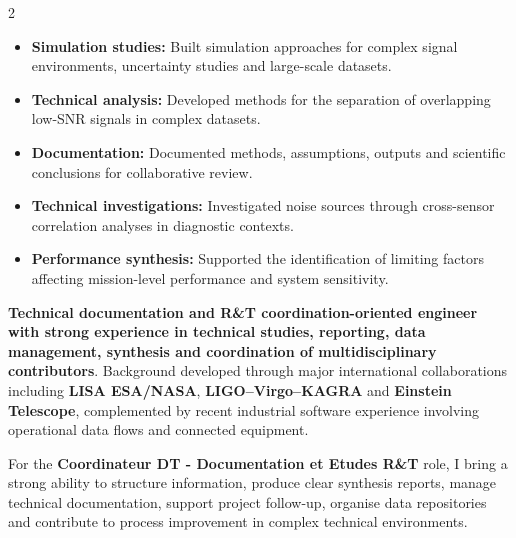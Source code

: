 \documentclass[8pt,a4paper,ragged2e,withhyper]{altacv}
\begin{document}
\begin{paracol}{2}
\begin{itemize}
  \item \textbf{Simulation studies:} Built simulation approaches for complex signal environments, uncertainty studies and large-scale datasets.
  \item \textbf{Technical analysis:} Developed methods for the separation of overlapping low-SNR signals in complex datasets.
  \item \textbf{Documentation:} Documented methods, assumptions, outputs and scientific conclusions for collaborative review.
  \item \textbf{Technical investigations:} Investigated noise sources through cross-sensor correlation analyses in diagnostic contexts.
  \item \textbf{Performance synthesis:} Supported the identification of limiting factors affecting mission-level performance and system sensitivity.
\end{itemize}

\switchcolumn


\textbf{Technical documentation and R\&T coordination-oriented engineer with strong experience in technical studies, reporting, data management, synthesis and coordination of multidisciplinary contributors}. Background developed through major international collaborations including \textbf{LISA ESA/NASA}, \textbf{LIGO--Virgo--KAGRA} and \textbf{Einstein Telescope}, complemented by recent industrial software experience involving operational data flows and connected equipment.

For the \textbf{Coordinateur DT - Documentation et Etudes R\&T} role, I bring a strong ability to structure information, produce clear synthesis reports, manage technical documentation, support project follow-up, organise data repositories and contribute to process improvement in complex technical environments.


\end{paracol}
\end{document}
